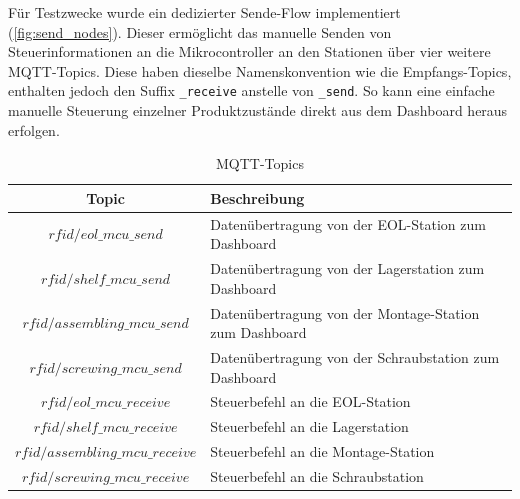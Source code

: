 Für Testzwecke wurde ein dedizierter Sende-Flow implementiert (\autoref{fig:send_nodes}). Dieser ermöglicht das manuelle Senden von Steuerinformationen an die Mikrocontroller an den Stationen über vier weitere MQTT-Topics. Diese haben dieselbe Namenskonvention wie die Empfangs-Topics, enthalten jedoch den Suffix \texttt{\_receive} anstelle von \texttt{\_send}. So kann eine einfache manuelle Steuerung einzelner Produktzustände direkt aus dem Dashboard heraus erfolgen.

\begin{table}[H]
	\centering
	\caption{MQTT-Topics}
	\label{tab:mqtt_topics}
	\begin{tabular}{|c|l|}
		\hline
		\textbf{Topic} & \textbf{Beschreibung} \\ \hline
		$rfid/eol\_mcu\_send$ & Datenübertragung von der EOL-Station zum Dashboard \\ 
		$rfid/shelf\_mcu\_send$ & Datenübertragung von der Lagerstation zum Dashboard \\ 
		$rfid/assembling\_mcu\_send$ & Datenübertragung von der Montage-Station zum Dashboard \\ 
		$rfid/screwing\_mcu\_send$ & Datenübertragung von der Schraubstation zum Dashboard \\ \hline
		$rfid/eol\_mcu\_receive$ & Steuerbefehl an die EOL-Station \\ 
		$rfid/shelf\_mcu\_receive$ & Steuerbefehl an die Lagerstation \\ 
		$rfid/assembling\_mcu\_receive$ & Steuerbefehl an die Montage-Station \\ 
		$rfid/screwing\_mcu\_receive$ & Steuerbefehl an die Schraubstation \\ \hline
	\end{tabular}
\end{table}


